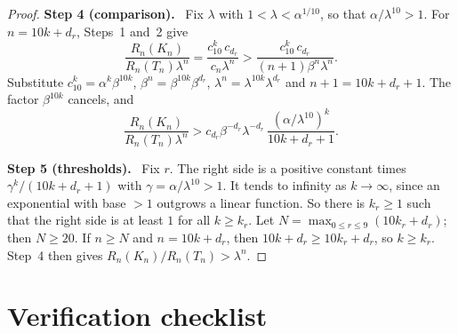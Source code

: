 \documentclass[11pt]{article}
\newcommand{\step}[1]{\par\smallskip\noindent\textbf{#1}\ }
\begin{document}
\begin{proof}
\step{Step 4 (comparison).} Fix \(\lambda\) with
\(1<\lambda<\alpha^{1/10}\), so that \(\alpha/\lambda^{10}>1\). For
\(n=10k+d_r\), Steps~1 and~2 give
\[
 \frac{R_n(K_n)}{R_n(T_n)\lambda^n}
 =\frac{c_{10}^k\,c_{d_r}}{c_n\lambda^n}
 >\frac{c_{10}^k\,c_{d_r}}{(n+1)\beta^n\lambda^n}.
\]
Substitute \(c_{10}^k=\alpha^k\beta^{10k}\),
\(\beta^n=\beta^{10k}\beta^{d_r}\),
\(\lambda^n=\lambda^{10k}\lambda^{d_r}\) and \(n+1=10k+d_r+1\). The factor
\(\beta^{10k}\) cancels, and
\[
 \frac{R_n(K_n)}{R_n(T_n)\lambda^n}
 >c_{d_r}\beta^{-d_r}\lambda^{-d_r}\,
   \frac{(\alpha/\lambda^{10})^k}{10k+d_r+1}.
\]

\step{Step 5 (thresholds).} Fix \(r\). The right side is a positive
constant times \(\gamma^k/(10k+d_r+1)\) with
\(\gamma=\alpha/\lambda^{10}>1\). It tends to infinity as \(k\to\infty\),
since an exponential with base \(>1\) outgrows a linear function. So there
is \(k_r\ge1\) such that the right side is at least \(1\) for all
\(k\ge k_r\). Let \(N=\max_{0\le r\le9}(10k_r+d_r)\); then \(N\ge20\). If
\(n\ge N\) and \(n=10k+d_r\), then \(10k+d_r\ge10k_r+d_r\), so
\(k\ge k_r\). Step~4 then gives \(R_n(K_n)/R_n(T_n)>\lambda^n\).
\end{proof}

\section*{Verification checklist}
\end{document}
